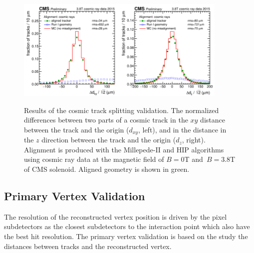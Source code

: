 \begin{figure}[htb]
    \begin{center}
        \includegraphics[width=0.45\textwidth]{../figs/Alignment/AlRes_CRAFT_hist_Delta_dxy.png}\includegraphics[width=0.45\textwidth]{../figs/Alignment/AlRes_CRAFT_hist_Delta_dz.png}
    \end{center}
    \caption{Results of the cosmic track splitting validation. The normalized differences between two parts of a cosmic track in the $xy$ distance between the track and the origin ($d_{xy}$, left), and in the distance in the $z$ direction between the track and the origin ($d_z$, right). Alignment is produced with the Millepede-II and HIP algorithms using cosmic ray data at the magnetic field of $B=0$T and~$B=3.8$T of CMS solenoid. Aligned geometry is shown in green.}
    \label{fig:trackSplit}
\end{figure}

\subsection{Primary Vertex Validation}
\label{sec:AlRes_PVvalid}

The resolution of the reconstructed vertex position is driven by the pixel subdetectors as the closest subdetectors to the interaction point which also have the best hit resolution. The primary vertex validation is based on the study the distances between tracks and the reconstructed vertex. 

